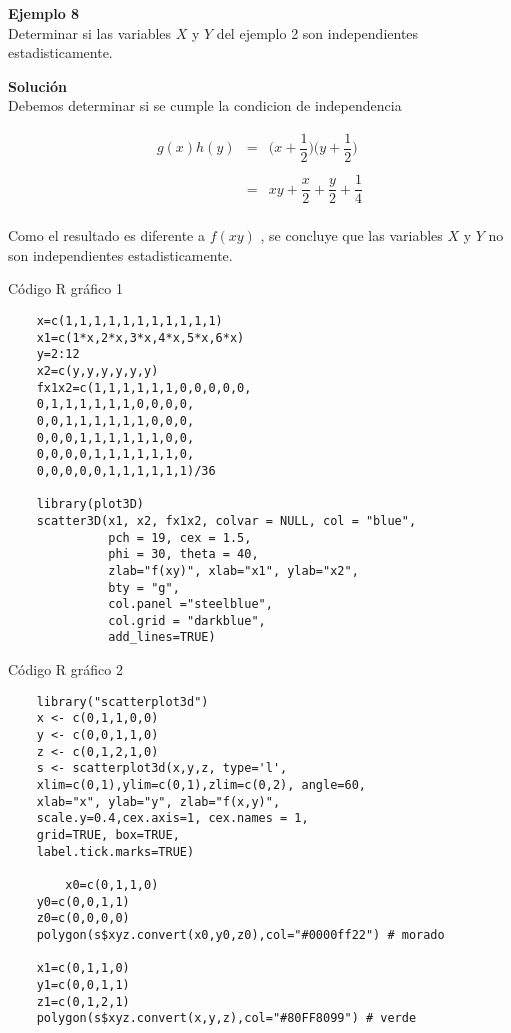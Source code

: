 \documentclass[base=hide,12pt]{elegantbook}
\begin{document}
\vspace{1cm}
\textcolor{col3}{\bf \large Ejemplo 8}\\
Determinar si las variables $X$ y $Y$ del ejemplo 2 son independientes estadisticamente.

\vspace{.5cm}
\textcolor{col3}{\bf \large Solución }\\

Debemos determinar si se cumple la condicion de independencia

\begin{eqnarray*}
	g(x)h(y) &=& \Bigg(x+\dfrac{1}{2}\Bigg) \Bigg(y + \dfrac{1}{2}\Bigg)\\
	&&\\
	   &=& xy + \dfrac{x}{2}+\dfrac{y}{2} + \dfrac{1}{4}\\
\end{eqnarray*}

Como el resultado es diferente a $f(xy)$ , se concluye que las variables $X$ y $Y$ no son independientes estadisticamente.

\vspace{1cm}

\begin{Box3}{Código R gráfico 1}
{\small 
\begin{verbatim}
	x=c(1,1,1,1,1,1,1,1,1,1,1)
	x1=c(1*x,2*x,3*x,4*x,5*x,6*x)
	y=2:12
	x2=c(y,y,y,y,y,y)
	fx1x2=c(1,1,1,1,1,1,0,0,0,0,0,
	0,1,1,1,1,1,1,0,0,0,0,
	0,0,1,1,1,1,1,1,0,0,0,
	0,0,0,1,1,1,1,1,1,0,0,
	0,0,0,0,1,1,1,1,1,1,0,
	0,0,0,0,0,1,1,1,1,1,1)/36
	
	library(plot3D)
	scatter3D(x1, x2, fx1x2, colvar = NULL, col = "blue",
	          pch = 19, cex = 1.5,
	          phi = 30, theta = 40,  
	          zlab="f(xy)", xlab="x1", ylab="x2",
	          bty = "g",
	          col.panel ="steelblue",
	          col.grid = "darkblue",
	          add_lines=TRUE)
\end{verbatim}	
}
\end{Box3}	


\begin{Box3}{Código R gráfico 2}
{\small 
\begin{verbatim}
	library("scatterplot3d")
	x <- c(0,1,1,0,0) 
	y <- c(0,0,1,1,0) 
	z <- c(0,1,2,1,0) 
	s <- scatterplot3d(x,y,z, type='l',
	xlim=c(0,1),ylim=c(0,1),zlim=c(0,2), angle=60,
	xlab="x", ylab="y", zlab="f(x,y)",
	scale.y=0.4,cex.axis=1, cex.names = 1,
	grid=TRUE, box=TRUE,
	label.tick.marks=TRUE)
	
		x0=c(0,1,1,0)
	y0=c(0,0,1,1)
	z0=c(0,0,0,0)
	polygon(s$xyz.convert(x0,y0,z0),col="#0000ff22") # morado
		
	x1=c(0,1,1,0)
	y1=c(0,0,1,1)
	z1=c(0,1,2,1)
	polygon(s$xyz.convert(x,y,z),col="#80FF8099") # verde
\end{verbatim}		
}
\end{Box3}
\end{document}
